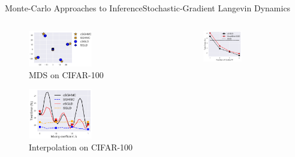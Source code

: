 \documentclass[AERbeamer%
              ,optEnglish%
              ,optBiber%
              ,optBibstyleAlphabetic%
              ,optBeamerClassicFormat%
              ]{AERlatex}%
\begin{document}
\begin{frame}[c]{Monte-Carlo Approaches to Inference}{Stochastic-Gradient Langevin Dynamics}
    \centering
    \begin{columns}[T]
    \begin{column}{0.48\textwidth}
        \begin{figure}
            \centering
            \includegraphics[width=0.55\textwidth]{SGMCMCMDS.png}
            \caption{MDS on CIFAR-100}
        \end{figure}
        \begin{figure}
            \centering
            \includegraphics[width=0.55\textwidth]{SGMCMCTestingErrors.png}
            \caption{Interpolation on CIFAR-100}
        \end{figure}
    \end{column}
    \begin{column}{0.48\textwidth}
        \begin{figure}
            \centering
            \includegraphics[width=0.48\textwidth]{SGMCMCComparison.png}

\end{figure}
\end{column}
\end{columns}
\end{frame}
\end{document}
